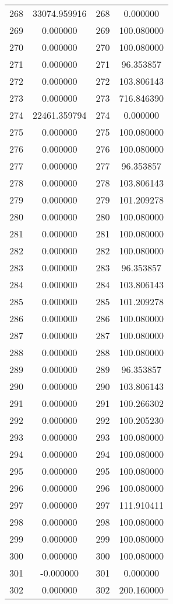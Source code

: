 \documentclass[12pt]{article}
\begin{document}
\begin{longtable}{@{}cccc@{}}
268 & 33074.959916 & 268 & 0.000000 \\
269 & 0.000000 & 269 & 100.080000 \\
270 & 0.000000 & 270 & 100.080000 \\
271 & 0.000000 & 271 & 96.353857 \\
272 & 0.000000 & 272 & 103.806143 \\
273 & 0.000000 & 273 & 716.846390 \\
274 & 22461.359794 & 274 & 0.000000 \\
275 & 0.000000 & 275 & 100.080000 \\
276 & 0.000000 & 276 & 100.080000 \\
277 & 0.000000 & 277 & 96.353857 \\
278 & 0.000000 & 278 & 103.806143 \\
279 & 0.000000 & 279 & 101.209278 \\
280 & 0.000000 & 280 & 100.080000 \\
281 & 0.000000 & 281 & 100.080000 \\
282 & 0.000000 & 282 & 100.080000 \\
283 & 0.000000 & 283 & 96.353857 \\
284 & 0.000000 & 284 & 103.806143 \\
285 & 0.000000 & 285 & 101.209278 \\
286 & 0.000000 & 286 & 100.080000 \\
287 & 0.000000 & 287 & 100.080000 \\
288 & 0.000000 & 288 & 100.080000 \\
289 & 0.000000 & 289 & 96.353857 \\
290 & 0.000000 & 290 & 103.806143 \\
291 & 0.000000 & 291 & 100.266302 \\
292 & 0.000000 & 292 & 100.205230 \\
293 & 0.000000 & 293 & 100.080000 \\
294 & 0.000000 & 294 & 100.080000 \\
295 & 0.000000 & 295 & 100.080000 \\
296 & 0.000000 & 296 & 100.080000 \\
297 & 0.000000 & 297 & 111.910411 \\
298 & 0.000000 & 298 & 100.080000 \\
299 & 0.000000 & 299 & 100.080000 \\
300 & 0.000000 & 300 & 100.080000 \\
301 & -0.000000 & 301 & 0.000000 \\
302 & 0.000000 & 302 & 200.160000 \\

\end{longtable}
\end{document}
